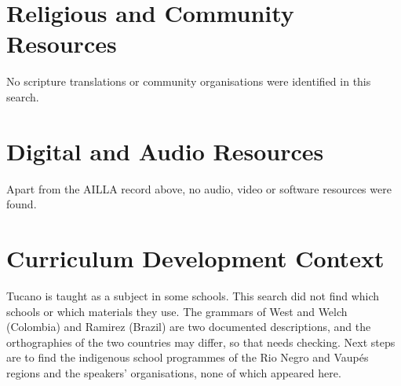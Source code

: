 \documentclass[12pt]{article}
\begin{document}
\section{Religious and Community Resources}
No scripture translations or community organisations were identified in this search.

\section{Digital and Audio Resources}
Apart from the AILLA record above, no audio, video or software resources were found.

\section{Curriculum Development Context}
Tucano is taught as a subject in some schools. This search did not find which schools or which materials they use. The grammars of West and Welch (Colombia) and Ramirez (Brazil) are two documented descriptions, and the orthographies of the two countries may differ, so that needs checking. Next steps are to find the indigenous school programmes of the Rio Negro and Vaup\'es regions and the speakers' organisations, none of which appeared here.
\end{document}
